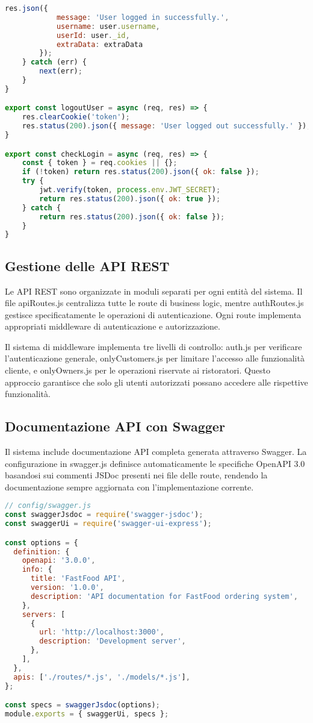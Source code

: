 \documentclass[12pt,a4paper]{article}
\begin{document}
\begin{lstlisting}[language=JavaScript, caption=Controller di autenticazione]
        res.json({
            message: 'User logged in successfully.',
            username: user.username,
            userId: user._id, 
            extraData: extraData
        });
    } catch (err) {
        next(err);
    }
}

export const logoutUser = async (req, res) => {
    res.clearCookie('token');
    res.status(200).json({ message: 'User logged out successfully.' });
}

export const checkLogin = async (req, res) => {
    const { token } = req.cookies || {};
    if (!token) return res.status(200).json({ ok: false });
    try {
        jwt.verify(token, process.env.JWT_SECRET);
        return res.status(200).json({ ok: true });
    } catch {
        return res.status(200).json({ ok: false });
    }
}
\end{lstlisting}

\subsection{Gestione delle API REST}

Le API REST sono organizzate in moduli separati per ogni entità del sistema. Il file apiRoutes.js centralizza tutte le route di business logic, mentre authRoutes.js gestisce specificatamente le operazioni di autenticazione. Ogni route implementa appropriati middleware di autenticazione e autorizzazione.

Il sistema di middleware implementa tre livelli di controllo: auth.js per verificare l'autenticazione generale, onlyCustomers.js per limitare l'accesso alle funzionalità cliente, e onlyOwners.js per le operazioni riservate ai ristoratori. Questo approccio garantisce che solo gli utenti autorizzati possano accedere alle rispettive funzionalità.

\subsection{Documentazione API con Swagger}

Il sistema include documentazione API completa generata attraverso Swagger. La configurazione in swagger.js definisce automaticamente le specifiche OpenAPI 3.0 basandosi sui commenti JSDoc presenti nei file delle route, rendendo la documentazione sempre aggiornata con l'implementazione corrente.

\begin{lstlisting}[language=JavaScript, caption=Configurazione Swagger]
// config/swagger.js
const swaggerJsdoc = require('swagger-jsdoc');
const swaggerUi = require('swagger-ui-express');

const options = {
  definition: {
    openapi: '3.0.0',
    info: {
      title: 'FastFood API',
      version: '1.0.0',
      description: 'API documentation for FastFood ordering system',
    },
    servers: [
      {
        url: 'http://localhost:3000',
        description: 'Development server',
      },
    ],
  },
  apis: ['./routes/*.js', './models/*.js'],
};

const specs = swaggerJsdoc(options);
module.exports = { swaggerUi, specs };
\end{lstlisting}
\end{document}

